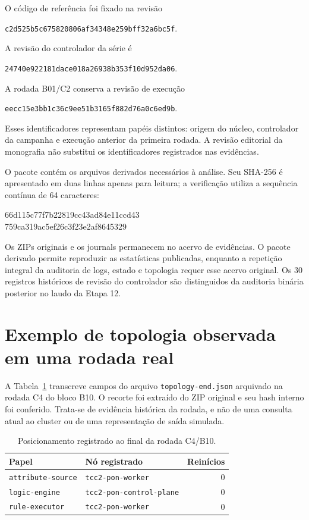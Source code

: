 O código de referência foi fixado na revisão
\begin{center}\small\texttt{c2d525b5c675820806af34348e259bff32a6bc5f}.\end{center}
A revisão do controlador da série é
\begin{center}\small\texttt{24740e922181dace018a26938b353f10d952da06}.\end{center}
A rodada B01/C2 conserva a revisão de execução
\begin{center}\small\texttt{eecc15e3bb1c36c9ee51b3165f882d76a0c6ed9b}.\end{center}
Esses identificadores representam papéis distintos: origem do núcleo, controlador da campanha e execução anterior da primeira rodada. A revisão editorial da monografia não substitui os identificadores registrados nas evidências.

O pacote  contém os arquivos derivados necessários à análise. Seu SHA-256 é apresentado em duas linhas apenas para leitura; a verificação utiliza a sequência contínua de 64 caracteres:
\begin{center}\ttfamily\small
66d115c77f7b22819cc43ad84e11ccd43\\
759ca319ac5ef26c3f23e2af8645329
\end{center}

Os ZIPs originais e os journals permanecem no acervo de evidências. O pacote derivado permite reproduzir as estatísticas publicadas, enquanto a repetição integral da auditoria de logs, estado e topologia requer esse acervo original. Os 30 registros históricos de revisão do controlador são distinguidos da auditoria binária posterior no laudo da Etapa 12.

\section*{Exemplo de topologia observada em uma rodada real}

A Tabela~\ref{tab:topologia-real} transcreve campos do arquivo \texttt{topology-end.json} arquivado na rodada C4 do bloco B10. O recorte foi extraído do ZIP original e seu hash interno foi conferido. Trata-se de evidência histórica da rodada, e não de uma consulta atual ao cluster ou de uma representação de saída simulada.

\begin{table}[htbp]
\centering\small
\caption{Posicionamento registrado ao final da rodada C4/B10.}
\label{tab:topologia-real}
\begin{tabularx}{\linewidth}{@{}p{3.8cm}Xr@{}}
\toprule
Papel & Nó registrado & Reinícios \\
\midrule
\texttt{attribute-source} & \texttt{tcc2-pon-worker} & 0 \\
\texttt{logic-engine} & \texttt{tcc2-pon-control-plane} & 0 \\
\texttt{rule-executor} & \texttt{tcc2-pon-worker} & 0 \\
\bottomrule
\end{tabularx}
\end{table}

